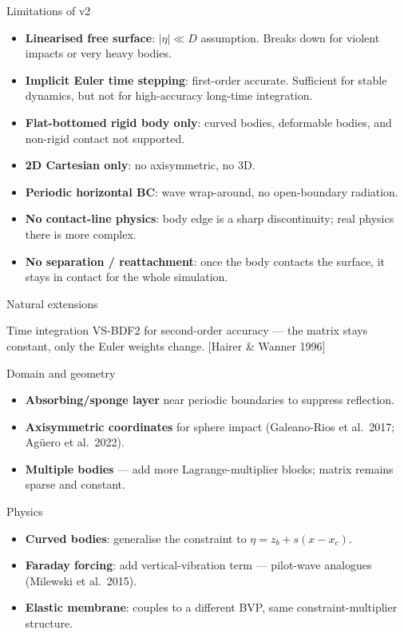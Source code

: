\documentclass[aspectratio=169, 10pt]{beamer}
\begin{document}
\begin{frame}{Limitations of v2}
\begin{itemize}
    \item \textbf{Linearised free surface}: $|\eta| \ll D$ assumption. Breaks down for violent impacts or very heavy bodies.
    \item \textbf{Implicit Euler time stepping}: first-order accurate. Sufficient for stable dynamics, but not for high-accuracy long-time integration.
    \item \textbf{Flat-bottomed rigid body only}: curved bodies, deformable bodies, and non-rigid contact not supported.
    \item \textbf{2D Cartesian only}: no axisymmetric, no 3D.
    \item \textbf{Periodic horizontal BC}: wave wrap-around, no open-boundary radiation.
    \item \textbf{No contact-line physics}: body edge is a sharp discontinuity; real physics there is more complex.
    \item \textbf{No separation / reattachment}: once the body contacts the surface, it stays in contact for the whole simulation.
\end{itemize}
\end{frame}

\begin{frame}{Natural extensions}
\footnotesize
\begin{block}{Time integration}
VS-BDF2 for second-order accuracy — the matrix stays constant, only the Euler weights change. [Hairer \& Wanner 1996]
\end{block}

\begin{block}{Domain and geometry}
\begin{itemize}
\item \textbf{Absorbing/sponge layer} near periodic boundaries to suppress reflection.
\item \textbf{Axisymmetric coordinates} for sphere impact (Galeano-Rios et al.\ 2017; Ag\"uero et al.\ 2022).
\item \textbf{Multiple bodies} — add more Lagrange-multiplier blocks; matrix remains sparse and constant.
\end{itemize}
\end{block}

\begin{block}{Physics}
\begin{itemize}
\item \textbf{Curved bodies}: generalise the constraint to $\eta = z_b + s(x - x_c)$.
\item \textbf{Faraday forcing}: add vertical-vibration term — pilot-wave analogues (Milewski et al.\ 2015).
\item \textbf{Elastic membrane}: couples to a different BVP, same constraint-multiplier structure.
\end{itemize}
\end{block}
\end{frame}
\end{document}
